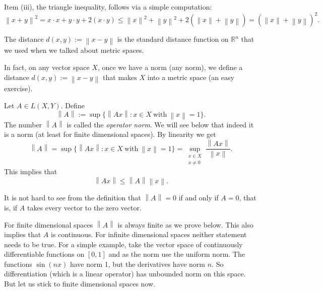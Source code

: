 \documentclass[12pt]{book}
\newcommand{\norm}[1]{\left\lVert {#1} \right\rVert}
\newcommand{\R}{{\mathbb{R}}}
\newcommand{\myindex}[1]{#1\index{#1}}
\theoremstyle{plain}
\theoremstyle{remark}
\theoremstyle{definition}
\theoremstyle{exercise}
\theoremstyle{example}
\begin{document}
Item (iii), the triangle inequality, follows via a simple computation:
\begin{equation*}
\norm{x+y}^2 
=
x \cdot x + y \cdot y + 2 (x \cdot y)
\leq
\norm{x}^2 + \norm{y}^2 + 2 (\norm{x}+\norm{y})
=
{(\norm{x} + \norm{y})}^2 .
\end{equation*}

The distance
$d(x,y) := \norm{x-y}$ is the standard
distance function on $\R^n$ that we used when we talked about metric spaces.

In fact, on any vector space $X$, once we
have a norm (any norm),
we define a distance $d(x,y) := \norm{x-y}$ that makes $X$ into
a metric space (an easy exercise).

Let $A \in L(X,Y)$.  Define
\begin{equation*}
\norm{A} :=
\sup \{ \norm{Ax} : x \in X ~ \text{with} ~ \norm{x} = 1 \} .
\end{equation*}
The number $\norm{A}$ is called the \emph{\myindex{operator norm}}.  We will see below
that indeed it is a norm (at least for finite dimensional spaces).
By linearity we get
\begin{equation*}
\norm{A} =
\sup \{ \norm{Ax} : x \in X ~ \text{with} ~ \norm{x} = 1 \}
=
\sup_{\substack{x \in X\\x\neq 0}} \frac{\norm{Ax}}{\norm{x}} .
\end{equation*}
This implies that
\begin{equation*}
\norm{Ax} \leq \norm{A}  \norm{x} .
\end{equation*}

It is not hard to see from the definition that $\norm{A} = 0$ if and
only if $A = 0$, that is, if $A$ takes every vector to the zero vector.

For finite dimensional spaces $\norm{A}$ is always finite as we prove
below.  This also implies that $A$ is continuous.
For infinite dimensional spaces neither statement needs to be true.  For a simple
example,
take the vector space of continuously differentiable functions on $[0,1]$
and as the norm use the uniform norm.  The functions
$\sin(nx)$ have norm 1, but the derivatives have norm $n$.  So
differentiation (which is a linear operator) has unbounded norm on this
space.  But let us stick to finite dimensional spaces now.
\end{document}
